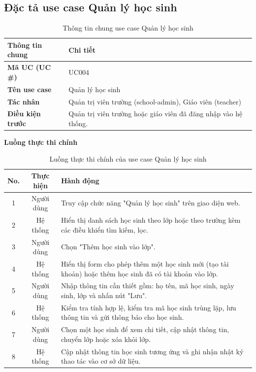 ﻿\documentclass[../DoAn.tex]{subfiles}
\begin{document}
\subsection{Đặc tả use case Quản lý học sinh}
\label{subsection:appendix:B.2}
\begin{table}[H]
\centering
\begin{tabular}{|p{4cm}|p{10cm}|}
\hline
\textbf{Thông tin chung} & \textbf{Chi tiết} \\ \hline
\textbf{Mã UC (UC \#)} & UC004 \\ \hline
\textbf{Tên use case} & Quản lý học sinh \\ \hline
\textbf{Tác nhân} & Quản trị viên trường (school-admin), Giáo viên (teacher) \\ \hline
\textbf{Điều kiện trước} & Quản trị viên trường hoặc giáo viên đã đăng nhập vào hệ thống. \\ \hline
\end{tabular}
\caption{Thông tin chung use case Quản lý học sinh}
\label{table:appendix:B.2_info}
\end{table}
\noindent\textbf{Luồng thực thi chính}
\begin{table}[H]
\centering
\begin{tabular}{|c|c|p{9cm}|}
\hline
\textbf{No.} & \textbf{Thực hiện} & \textbf{Hành động} \\ \hline
1 & Người dùng & Truy cập chức năng "Quản lý học sinh" trên giao diện web. \\ \hline
2 & Hệ thống & Hiển thị danh sách học sinh theo lớp hoặc theo trường kèm các điều khiển tìm kiếm, lọc. \\ \hline
3 & Người dùng & Chọn "Thêm học sinh vào lớp". \\ \hline
4 & Hệ thống & Hiển thị form cho phép thêm một học sinh mới (tạo tài khoản) hoặc thêm học sinh đã có tài khoản vào lớp. \\ \hline
5 & Người dùng & Nhập thông tin cần thiết gồm: họ tên, mã học sinh, ngày sinh, lớp và nhấn nút "Lưu". \\ \hline
6 & Hệ thống & Kiểm tra tính hợp lệ, kiểm tra mã học sinh trùng lặp, lưu thông tin và gửi thông báo cho học sinh. \\ \hline
7 & Người dùng & Chọn một học sinh để xem chi tiết, cập nhật thông tin, chuyển lớp hoặc xóa khỏi lớp. \\ \hline
8 & Hệ thống & Cập nhật thông tin học sinh tương ứng và ghi nhận nhật ký thao tác vào cơ sở dữ liệu. \\ \hline
\end{tabular}
\caption{Luồng thực thi chính của use case Quản lý học sinh}
\label{table:appendix:B.2_main}
\end{table}
\end{document}
